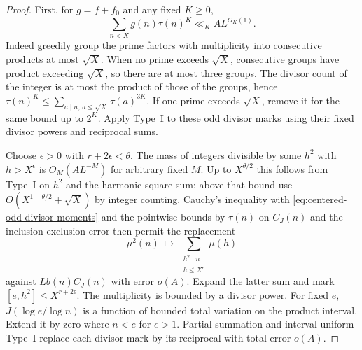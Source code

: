 \documentclass[11pt,a4paper]{article}
\theoremstyle{paperplain}
\numberwithin{equation}{section}
\begin{document}
\begin{proof}
First, for $g=f+f_0$ and any fixed $K\ge0$,
\begin{equation}\label{eq:centered-odd-divisor-moments}
             \sum_{n<X}g(n)\tau(n)^K\ll_K A L^{O_K(1)}.
\end{equation}
Indeed greedily group the prime factors with multiplicity into
consecutive products at most $\sqrt X$. When no prime exceeds
$\sqrt X$, consecutive groups have product exceeding $\sqrt X$,
so there are at most three groups. The divisor count of the
integer is at most the product of those of the groups, hence
$\tau(n)^K\le\sum_{a\mid n,\,a\le\sqrt X}\tau(a)^{3K}$.
If one prime exceeds $\sqrt X$, remove it for the same bound
up to $2^K$. Apply Type~I to these odd divisor marks using
their fixed divisor powers and reciprocal sums.

Choose $\epsilon>0$ with $r+2\epsilon<\theta$.
The mass of integers divisible by some $h^2$ with $h>X^\epsilon$
is $O_M(AL^{-M})$ for arbitrary fixed $M$. Up to $X^{\theta/2}$
this follows from Type~I on $h^2$ and the harmonic square sum;
above that bound use $O(X^{1-\theta/2}+\sqrt X)$ by integer
counting. Cauchy's inequality with
\eqref{eq:centered-odd-divisor-moments} and the pointwise bounds
by $\tau(n)$ on $C_J(n)$ and the inclusion-exclusion error then
permit the replacement
\[
 \mu^2(n)\ \longmapsto\
             \sum_{\substack{h^2\mid n\\h\le X^\epsilon}}\mu(h)
\]
against $L b(n) C_J(n)$ with error $o(A)$.
Expand the latter sum and mark $[e,h^2]\le X^{r+2\epsilon}$.
The multiplicity is bounded by a divisor power. For fixed $e$,
$J(\log e/\log n)$ is a function of bounded total variation
on the product interval. Extend it by zero where $n<e$ for
$e>1$. Partial summation and interval-uniform Type~I replace
each divisor mark by its reciprocal with total error $o(A)$.


\end{proof}
\end{document}
